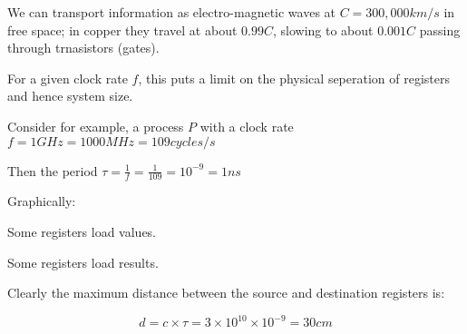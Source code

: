 \documentclass[a4paper,12pt]{article}
\begin{document}
We can transport information as electro-magnetic waves at $C = 300,000
km/s$ in free space; in copper they travel at about $0.99 C$, slowing to
about $0.001C$ passing through trnasistors (gates).


For a given clock rate $f$, this puts a limit on the physical seperation
of registers and hence system size.

Consider for example, a process $P$ with a clock rate $f = 1GHz =
1000 MHz = 109 cycles/s$

Then the period $\tau = \frac{1}{f} = \frac{1}{109} = 10^{-9} = 1 ns$

Graphically:


Some registers load values.

Some registers load results.


Clearly the maximum distance between the source and destination
registers is:

\[ d = c \times \tau = 3 \times 10^{10} \times 10^{-9} = 30 cm\]
\end{document}
